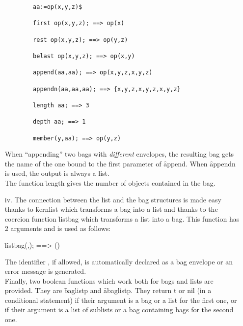 \begin{itemize}
\begin{verbatim}
        aa:=op(x,y,z)$

        first op(x,y,z); ==> op(x)

        rest op(x,y,z); ==> op(y,z)

        belast op(x,y,z); ==> op(x,y)

        append(aa,aa); ==> op(x,y,z,x,y,z)

        appendn(aa,aa,aa); ==> {x,y,z,x,y,z,x,y,z}

        length aa; ==> 3

        depth aa; ==> 1

        member(y,aa); ==> op(y,z)
\end{verbatim}
When ``appending'' two bags with \emph{different} envelopes, the resulting bag
gets the name of the one bound to the first parameter of \f{append}. When  
\f{appendn} is used, the output is always a list.\\
The function \f{length} gives the number of objects contained in the 
bag.
\item[iv.]
\hypertarget{operator:LISTBAG}{}
The connection between the list and the bag structures is made easy
thanks to \f{kernlist} which transforms a bag into a list and thanks to
the coercion function \f{listbag} which transforms a list into a bag. 
This function has 2 arguments
and is used as follows:
\begin{syntax}
        \f{listbag}(,); ==> ()
\end{syntax}
The identifier , if allowed, is automatically declared as a bag
envelope or an error message is generated. \\[3pt]
\hypertarget{operator:BAGLISTP}{}
\hypertarget{operator:ABAGLISTP}{}
Finally, two boolean functions which work both for bags and lists are
provided. They are \f{baglistp} and \f{abaglistp}.
They return t or nil (in a conditional statement) if their argument
is a bag or a list for the first one, or if their argument is a list of
sublists or a bag containing bags for the second one.
\end{itemize}
